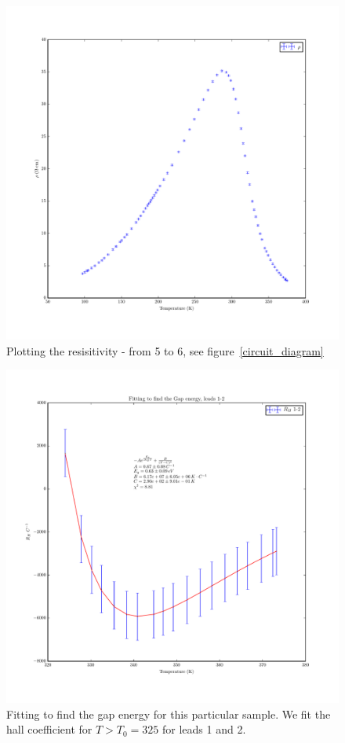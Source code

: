 \documentclass[reprint, nobibnotes, amssymb, amsmath, amsfonts, physics, mathtools, mathrsfs, floatfix]{revtex4-1}
\begin{document}
\begin{widetext}
      \begin{figure}[h]
        \centering
        \includegraphics[width=\linewidth]{../plots/rho_vs_T.pdf}
        \caption{Plotting the resisitivity - from 5 to 6, see figure~\ref{circuit_diagram} \label{rho_vs_T}}
      \end{figure}

      \begin{figure}[h]
        \centering
        \includegraphics[width=\linewidth]{../plots/rh_12_eg.pdf}
        \caption{Fitting to find the gap energy for this particular sample.  We fit the hall coefficient for $T > T_0 = 325$ for leads 1 and 2. \label{rh_12_eg}}
      \end{figure}


\end{widetext}
\end{document}
